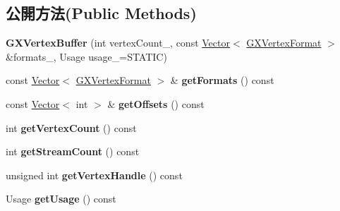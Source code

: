 \subsection*{公開方法(Public Methods)}
\begin{DoxyCompactItemize}
\item 
{\bfseries G\+X\+Vertex\+Buffer} (int vertex\+Count\+\_\+, const \hyperlink{class_magnum_1_1_vector}{Vector}$<$ \hyperlink{class_magnum_1_1_g_x_vertex_format}{G\+X\+Vertex\+Format} $>$ \&formats\+\_\+, Usage usage\+\_\+=S\+T\+A\+T\+IC)\hypertarget{class_magnum_1_1_g_x_vertex_buffer_ab989653e317232fc1103cec196c3cde5}{}\label{class_magnum_1_1_g_x_vertex_buffer_ab989653e317232fc1103cec196c3cde5}

\item 
const \hyperlink{class_magnum_1_1_vector}{Vector}$<$ \hyperlink{class_magnum_1_1_g_x_vertex_format}{G\+X\+Vertex\+Format} $>$ \& {\bfseries get\+Formats} () const \hypertarget{class_magnum_1_1_g_x_vertex_buffer_a53e959a875f07c690d17850f635170d6}{}\label{class_magnum_1_1_g_x_vertex_buffer_a53e959a875f07c690d17850f635170d6}

\item 
const \hyperlink{class_magnum_1_1_vector}{Vector}$<$ int $>$ \& {\bfseries get\+Offsets} () const \hypertarget{class_magnum_1_1_g_x_vertex_buffer_a9643c1d5bf2bde53e517edc9055660d3}{}\label{class_magnum_1_1_g_x_vertex_buffer_a9643c1d5bf2bde53e517edc9055660d3}

\item 
int {\bfseries get\+Vertex\+Count} () const \hypertarget{class_magnum_1_1_g_x_vertex_buffer_a2ed34e2b8a569343938243fb45b8a49a}{}\label{class_magnum_1_1_g_x_vertex_buffer_a2ed34e2b8a569343938243fb45b8a49a}

\item 
int {\bfseries get\+Stream\+Count} () const \hypertarget{class_magnum_1_1_g_x_vertex_buffer_a931bdbe2b3f76d1c9f44843ca506eec0}{}\label{class_magnum_1_1_g_x_vertex_buffer_a931bdbe2b3f76d1c9f44843ca506eec0}

\item 
unsigned int {\bfseries get\+Vertex\+Handle} () const \hypertarget{class_magnum_1_1_g_x_vertex_buffer_a30b98fc9bb15f0ccaf340f9c2279a2ab}{}\label{class_magnum_1_1_g_x_vertex_buffer_a30b98fc9bb15f0ccaf340f9c2279a2ab}

\item 
Usage {\bfseries get\+Usage} () const \hypertarget{class_magnum_1_1_g_x_vertex_buffer_a0b1219d8176655b2e41cfb13b03af72a}{}\label{class_magnum_1_1_g_x_vertex_buffer_a0b1219d8176655b2e41cfb13b03af72a}


\end{DoxyCompactItemize}
